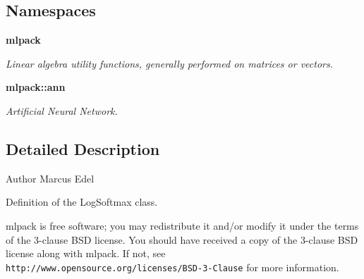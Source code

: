 \subsection*{Namespaces}
\begin{DoxyCompactItemize}
\item 
 {\bf mlpack}
\begin{DoxyCompactList}\small\item\em Linear algebra utility functions, generally performed on matrices or vectors. \end{DoxyCompactList}\item 
 {\bf mlpack\+::ann}
\begin{DoxyCompactList}\small\item\em Artificial Neural Network. \end{DoxyCompactList}\end{DoxyCompactItemize}


\subsection{Detailed Description}
\begin{DoxyAuthor}{Author}
Marcus Edel
\end{DoxyAuthor}
Definition of the Log\+Softmax class.

mlpack is free software; you may redistribute it and/or modify it under the terms of the 3-\/clause B\+SD license. You should have received a copy of the 3-\/clause B\+SD license along with mlpack. If not, see {\tt http\+://www.\+opensource.\+org/licenses/\+B\+S\+D-\/3-\/\+Clause} for more information. 